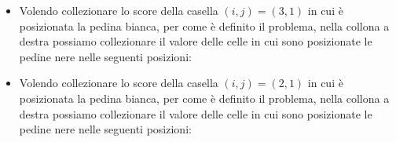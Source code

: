 \begin{itemize}
    \item {
    Volendo collezionare lo score della casella $(i, j) = (3, 1)$ in cui è posizionata la pedina bianca, per come è definito il problema, nella collona a destra possiamo collezionare il valore delle celle in cui sono posizionate le pedine nere nelle seguenti posizioni:
    \newline
    }
    \newpage
    \item {
        Volendo collezionare lo score della casella $(i, j) = (2, 1)$ in cui è posizionata la pedina bianca, per come è definito il problema, nella collona a destra possiamo collezionare il valore delle celle in cui sono posizionate le pedine nere nelle seguenti posizioni:
    \newline
    }


\end{itemize}
